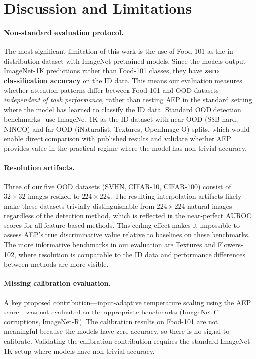 \documentclass{article}
\newcommand{\AEP}{\textsc{AEP}}
\begin{document}
\section{Discussion and Limitations}
\label{sec:limitations}

\paragraph{Non-standard evaluation protocol.}
The most significant limitation of this work is the use of Food-101 as the in-distribution dataset with ImageNet-pretrained models. Since the models output ImageNet-1K predictions rather than Food-101 classes, they have \textbf{zero classification accuracy} on the ID data. This means our evaluation measures whether attention patterns differ between Food-101 and OOD datasets \emph{independent of task performance}, rather than testing \AEP{} in the standard setting where the model has learned to classify the ID data. Standard OOD detection benchmarks~\citep{zhang2023openood} use ImageNet-1K as the ID dataset with near-OOD (SSB-hard, NINCO) and far-OOD (iNaturalist, Textures, OpenImage-O) splits, which would enable direct comparison with published results and validate whether \AEP{} provides value in the practical regime where the model has non-trivial accuracy.

\paragraph{Resolution artifacts.}
Three of our five OOD datasets (SVHN, CIFAR-10, CIFAR-100) consist of $32 \times 32$ images resized to $224 \times 224$. The resulting interpolation artifacts likely make these datasets trivially distinguishable from $224 \times 224$ natural images regardless of the detection method, which is reflected in the near-perfect AUROC scores for all feature-based methods. This ceiling effect makes it impossible to assess \AEP{}'s true discriminative value relative to baselines on these benchmarks. The more informative benchmarks in our evaluation are Textures and Flowers-102, where resolution is comparable to the ID data and performance differences between methods are more visible.

\paragraph{Missing calibration evaluation.}
A key proposed contribution---input-adaptive temperature scaling using the AEP score---was not evaluated on the appropriate benchmarks (ImageNet-C corruptions, ImageNet-R). The calibration results on Food-101 are not meaningful because the models have zero accuracy, so there is no signal to calibrate. Validating the calibration contribution requires the standard ImageNet-1K setup where models have non-trivial accuracy.
\end{document}
